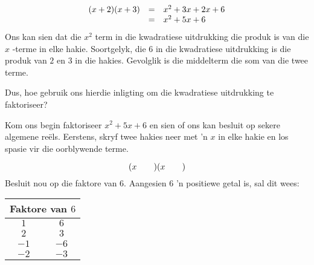\begin{equation*}
\begin{array}{ccl}\hfill (x+2)(x+3)& =& x^2+3x+2x+6 \\ & =& {x}^{2}+5x+6\hfill \end{array}
\end{equation*}
Ons kan sien dat die ${x}^{2}$ term in die kwadratiese uitdrukking die produk is van die $x$ -terme in elke hakie. Soortgelyk, die $6$ in die kwadratiese uitdrukking is die produk van $2$ en $3$ in die hakies. Gevolglik is die middelterm die
som van die twee terme.\par 
Dus, hoe gebruik ons hierdie inligting om die kwadratiese uitdrukking te faktoriseer?\par 
Kom ons begin faktoriseer ${x}^{2}+5x+6$ en sien of ons kan besluit op sekere algemene reëls. Eerstens, skryf twee hakies neer met ’n $x$ in elke hakie en los spasie vir die oorblywende terme.\par 
\begin{equation*}
(x\phantom{\rule{2.em}{0ex}})(x\phantom{\rule{2.em}{0ex}})
\end{equation*}
Besluit nou op die faktore van $6$. Aangesien $6$ ’n positiewe getal is, sal dit wees:\par 
\begin{table}[H]
\begin{center}
\noindent

\begin{tabular}[t]{|c|c|}\hline
\multicolumn{2}{|c|}{\textbf{Faktore van $6$}}
\\ \hline
$1$ &
$6$%
\\ \hline
$2$ &
$3$%
\\ \hline
$-1$ &
$-6$%
\\ \hline
$-2$ &
$-3$%
\\ \hline
\end{tabular}
\end{center}
\end{table}
